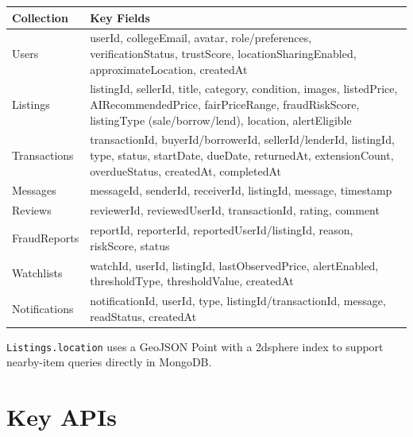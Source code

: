 \documentclass[11pt,a4paper]{article}
\begin{document}
\begin{longtable}{P{0.19\textwidth}P{0.72\textwidth}}
\toprule
\textbf{Collection} & \textbf{Key Fields}\\
\midrule
\endhead
Users &
userId, collegeEmail, avatar, role/preferences, verificationStatus, trustScore, locationSharingEnabled, approximateLocation, createdAt\\
\addlinespace
Listings &
listingId, sellerId, title, category, condition, images, listedPrice, AIRecommendedPrice, fairPriceRange, fraudRiskScore, listingType (sale/borrow/lend), location, alertEligible\\
\addlinespace
Transactions &
transactionId, buyerId/borrowerId, sellerId/lenderId, listingId, type, status, startDate, dueDate, returnedAt, extensionCount, overdueStatus, createdAt, completedAt\\
\addlinespace
Messages &
messageId, senderId, receiverId, listingId, message, timestamp\\
\addlinespace
Reviews &
reviewerId, reviewedUserId, transactionId, rating, comment\\
\addlinespace
FraudReports &
reportId, reporterId, reportedUserId/listingId, reason, riskScore, status\\
\addlinespace
Watchlists &
watchId, userId, listingId, lastObservedPrice, alertEnabled, thresholdType, thresholdValue, createdAt\\
\addlinespace
Notifications &
notificationId, userId, type, listingId/transactionId, message, readStatus, createdAt\\
\bottomrule
\end{longtable}

\texttt{Listings.location} uses a GeoJSON Point with a 2dsphere index to support nearby-item queries directly in MongoDB.

\section{Key APIs}
\end{document}
